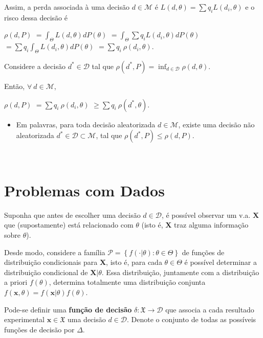 \documentclass[
]{book}
\providecommand{\tightlist}{%
  \setlength{\itemsep}{0pt}\setlength{\parskip}{0pt}}
\begin{document}
Assim, a perda associada à uma decisão \(d\in\mathcal{M}\) é \(L(d,\theta) = \sum q_i L(d_i,\theta)\) e o risco dessa decisão é

\(\rho(d,P)\) \(= \displaystyle \int_\Theta L(d,\theta) dP(\theta)\) \(=\displaystyle \int_\Theta \sum q_i L(d_i,\theta) dP(\theta)\) \(=\displaystyle \sum q_i \int_\Theta L(d_i,\theta) dP(\theta)\) \(=\displaystyle \sum q_i~ \rho(d_i,\theta)\).

Considere a decisão \({d}^* \in \mathcal{D}\) tal que \(\rho({d}^*,P) = \displaystyle \inf_{d \in \mathcal{D}} \rho(d,\theta)\).

Então, \(\forall ~d \in \mathcal{M}\),

\(\rho(d,P)\) \(=\displaystyle \sum q_i~ \rho(d_i,\theta)\) \(\geq \displaystyle \sum q_i~ \rho({d}^*,\theta)\).

\begin{itemize}
\tightlist
\item
  Em palavras, para toda decisão aleatorizada \(d\in\mathcal{M}\), existe uma decisão não aleatorizada \({d}^*\in\mathcal{D} \subset\mathcal{M}\), tal que \(\rho({d}^*,P) \leq \rho(d,P)\).
\end{itemize}

\(~\)

\hypertarget{DecDados}{%
\section{Problemas com Dados}\label{DecDados}}

Suponha que antes de escolher uma decisão \(d \in \mathcal{D}\), é possível observar um v.a. \(\boldsymbol X\) que (supostamente) está relacionado com \(\theta\) (isto é, \(\boldsymbol X\) traz alguma informação sobre \(\theta\)).

Desde modo, considere a família \(\mathcal{P}=\left\{ f(\cdot|\theta) : \theta \in \Theta\right\}\) de funções de distribuição condicionais para \(\boldsymbol X\), isto é, para cada \(\theta \in \Theta\) é possível determinar a distribuição condicional de \(\boldsymbol X|\theta\). Essa distribuição, juntamente com a distribuição a priori \(f(\theta)\), determina totalmente uma distribuição conjunta \(f(\boldsymbol x,\theta) = f(\boldsymbol x|\theta) f(\theta)\).

Pode-se definir uma \textbf{função de decisão} \(\delta: \mathfrak{X} \longrightarrow \mathcal{D}\) que associa a cada resultado experimental \(\boldsymbol x \in \mathfrak{X}\) uma decisão \(d \in \mathcal{D}\). Denote o conjunto de todas as possíveis funções de decisão por \(\Delta\).
\end{document}
